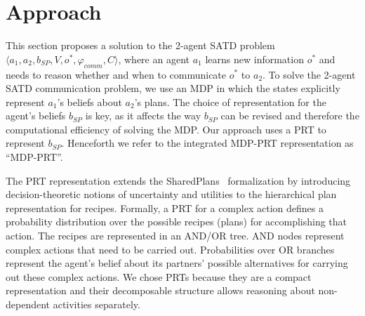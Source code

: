 \section{Approach}
\label{sec:app}

This section proposes a solution to the 2-agent SATD problem $\langle a_1, a_2, b_{SP}, V, o^*, \varphi_{comm}, C \rangle$, where an agent $a_1$ learns new information $o^*$ and needs to reason whether and when to communicate $o^*$ to $a_2$. 
To solve the 2-agent SATD communication problem, we use an MDP in which the states explicitly represent $a_1$'s beliefs about $a_2$'s plans. 
The choice of representation for the agent's beliefs $b_{SP}$ is key, as it affects the way $b_{SP}$ can be revised and therefore the computational efficiency of solving the MDP. Our approach uses a PRT to represent $b_{SP}$. Henceforth we refer to the integrated MDP-PRT representation as ``MDP-PRT''.

The PRT representation extends the SharedPlans~\cite{grosz1996collaborative} formalization by introducing decision-theoretic notions  of uncertainty and utilities to the hierarchical plan representation for recipes. 
Formally,  a PRT for a complex action defines a probability distribution over the possible recipes (plans) for accomplishing that action. The recipes are represented in an AND/OR tree. AND nodes represent complex actions that need to be carried out. Probabilities over OR branches  represent the agent's belief about its partners' possible alternatives for carrying out these complex actions.
  We chose PRTs because they are a compact representation and their decomposable structure allows reasoning about non-dependent activities separately.

